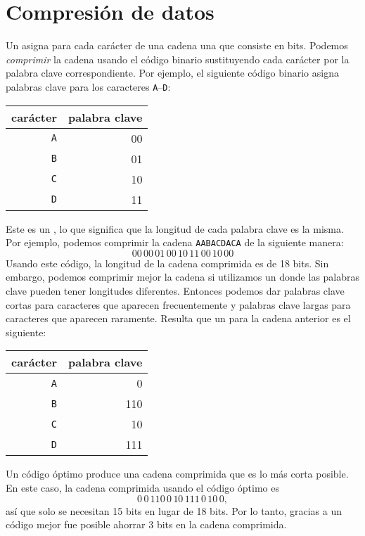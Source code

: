 \section{Compresión de datos}


Un  asigna para cada carácter
de una cadena una  que consiste en bits.
Podemos \emph{comprimir} la cadena usando el código binario
sustituyendo cada carácter por la
palabra clave correspondiente.
Por ejemplo, el siguiente código binario
asigna palabras clave para los caracteres
\texttt{A}--\texttt{D}:
\begin{center}
    \begin{tabular}{rr}
        carácter   & palabra clave \\
        \hline
        \texttt{A} & 00            \\
        \texttt{B} & 01            \\
        \texttt{C} & 10            \\
        \texttt{D} & 11            \\
    \end{tabular}
\end{center}
Este es un ,
lo que significa que la longitud de cada
palabra clave es la misma.
Por ejemplo, podemos comprimir la cadena
\texttt{AABACDACA} de la siguiente manera:
\[00\,00\,01\,00\,10\,11\,00\,10\,00\]
Usando este código, la longitud de la cadena comprimida
es de 18 bits.
Sin embargo, podemos comprimir mejor la cadena
si utilizamos un 
donde las palabras clave pueden tener longitudes diferentes.
Entonces podemos dar palabras clave cortas para
caracteres que aparecen frecuentemente
y palabras clave largas para caracteres
que aparecen raramente.
Resulta que un 
para la cadena anterior es el siguiente:
\begin{center}
    \begin{tabular}{rr}
        carácter   & palabra clave \\
        \hline
        \texttt{A} & 0             \\
        \texttt{B} & 110           \\
        \texttt{C} & 10            \\
        \texttt{D} & 111           \\
    \end{tabular}
\end{center}
Un código óptimo produce una cadena comprimida
que es lo más corta posible.
En este caso, la cadena comprimida usando
el código óptimo es
\[0\,0\,110\,0\,10\,111\,0\,10\,0,\]
así que solo se necesitan 15 bits en lugar de 18 bits.
Por lo tanto, gracias a un código mejor fue posible
ahorrar 3 bits en la cadena comprimida.

